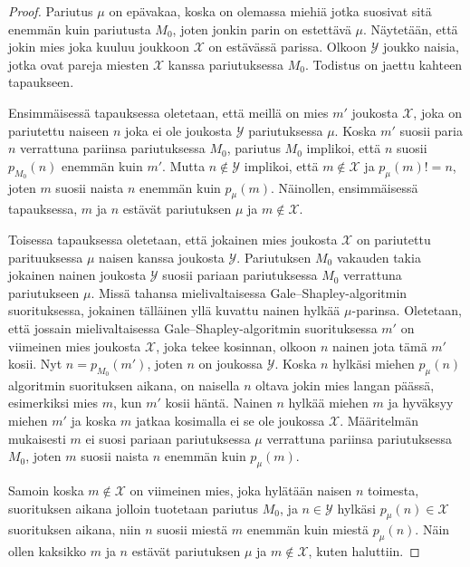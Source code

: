 \documentclass[finnish]{tktltiki2}
\theoremstyle{definition}
\theoremstyle{remark}
\begin{document}
\begin{proof}\cite[s. 55]{gusfield1989stable}\label{strategy-blockingtod}
	Pariutus $\mu$ on epävakaa, koska on olemassa miehiä jotka suosivat sitä enemmän kuin pariutusta $M_0$, joten jonkin parin on estettävä $\mu$. Näytetään, että jokin mies joka kuuluu joukkoon $\mathcal{X}$ on estävässä parissa. Olkoon $\mathcal{Y}$ joukko naisia, jotka ovat pareja miesten $\mathcal{X}$ kanssa pariutuksessa $M_0$. Todistus on jaettu kahteen tapaukseen.
	
	Ensimmäisessä tapauksessa oletetaan, että meillä on mies $m'$ joukosta $\mathcal{X}$, joka on pariutettu naiseen $n$ joka ei ole joukosta $\mathcal{Y}$ pariutuksessa $\mu$. Koska $m'$ suosii paria $n$ verrattuna pariinsa pariutuksessa $M_0$, pariutus $M_0$ implikoi, että $n$ suosii $p_{M_0}(n)$ enemmän kuin $m'$. Mutta $n \notin \mathcal{Y}$ implikoi, että $m \notin \mathcal{X}$ ja $p_\mu(m) != n$, joten $m$ suosii naista $n$ enemmän kuin $p_\mu(m)$. Näinollen, ensimmäisessä tapauksessa, $m$ ja $n$ estävät pariutuksen $\mu$ ja $m \notin \mathcal{X}$.
	
	Toisessa tapauksessa oletetaan, että jokainen mies joukosta $\mathcal{X}$ on pariutettu parituuksessa $\mu$ naisen kanssa joukosta $\mathcal{Y}$. Pariutuksen $M_0$ vakauden takia jokainen nainen joukosta $\mathcal{Y}$ suosii pariaan pariutuksessa $M_0$ verrattuna pariutukseen $\mu$. Missä tahansa mielivaltaisessa Gale--Shapley-algoritmin suorituksessa, jokainen tälläinen yllä kuvattu nainen hylkää $\mu$-parinsa. Oletetaan, että jossain mielivaltaisessa Gale--Shapley-algoritmin suorituksessa $m'$ on viimeinen mies joukosta $\mathcal{X}$, joka tekee kosinnan, olkoon $n$ nainen jota tämä $m'$ kosii. Nyt $n = p_{M_0}(m')$, joten $n$ on joukossa $\mathcal{Y}$. Koska $n$ hylkäsi miehen $p_\mu(n)$ algoritmin suorituksen aikana, on naisella $n$ oltava jokin mies langan päässä, esimerkiksi mies $m$, kun $m'$ kosii häntä. Nainen $n$ hylkää miehen $m$ ja hyväksyy miehen $m'$ ja koska $m$ jatkaa kosimalla ei se ole joukossa $\mathcal{X}$. Määritelmän mukaisesti $m$ ei suosi pariaan pariutuksessa $\mu$ verrattuna pariinsa pariutuksessa $M_0$, joten $m$ suosii naista $n$ enemmän kuin $p_\mu(m)$.
	
	Samoin koska $m \notin \mathcal{X}$ on viimeinen mies, joka hylätään naisen $n$ toimesta, suorituksen aikana jolloin tuotetaan pariutus $M_0$, ja $n \in \mathcal{Y}$ hylkäsi $p_\mu(n) \in \mathcal{X}$ suorituksen aikana, niin $n$ suosii miestä $m$ enemmän kuin miestä $p_\mu(n)$. Näin ollen kaksikko $m$ ja $n$ estävät pariutuksen $\mu$ ja $m \notin \mathcal{X}$, kuten haluttiin.	
\end{proof}
\end{document}
